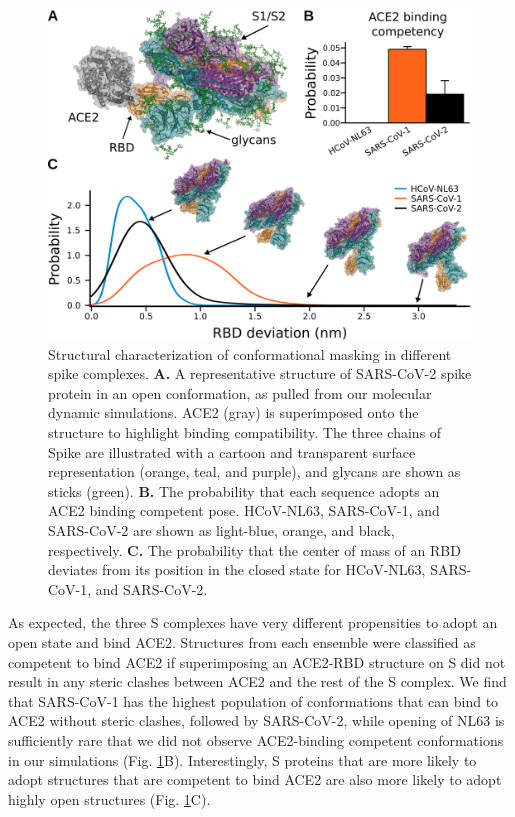 \documentclass[../main.tex]{subfiles}
\begin{document}
        \begin{figure}[!htb] %
            \centering
            \includegraphics[width=\linewidth]{ch7-fig2.png}
            \caption[Structural characterization of conformational masking in different spike complexes.]
                {Structural characterization of conformational masking in different spike complexes. \textbf{A.} A representative structure of SARS-CoV-2 spike protein in an open conformation, as pulled from our molecular dynamic simulations. ACE2 (gray) is superimposed onto the structure to highlight binding compatibility. The three chains of Spike are illustrated with a cartoon and transparent surface representation (orange, teal, and purple), and glycans are shown as sticks (green). \textbf{B.} The probability that each sequence adopts an ACE2 binding competent pose. HCoV-NL63, SARS-CoV-1, and SARS-CoV-2 are shown as light-blue, orange, and black, respectively. \textbf{C.} The probability that the center of mass of an RBD deviates from its position in the closed state for HCoV-NL63, SARS-CoV-1, and SARS-CoV-2.}
            \label{fig:ch7-fig2}
        \end{figure}

        As expected, the three S complexes have very different propensities to adopt an open state and bind ACE2. Structures from each ensemble were classified as competent to bind ACE2 if superimposing an ACE2-RBD structure on S did not result in any steric clashes between ACE2 and the rest of the S complex. We find that SARS-CoV-1 has the highest population of conformations that can bind to ACE2 without steric clashes, followed by SARS-CoV-2, while opening of NL63 is sufficiently rare that we did not observe ACE2-binding competent conformations in our simulations (Fig. \ref{fig:ch7-fig2}B). Interestingly, S proteins that are more likely to adopt structures that are competent to bind ACE2 are also more likely to adopt highly open structures (Fig. \ref{fig:ch7-fig2}C).
\end{document}
